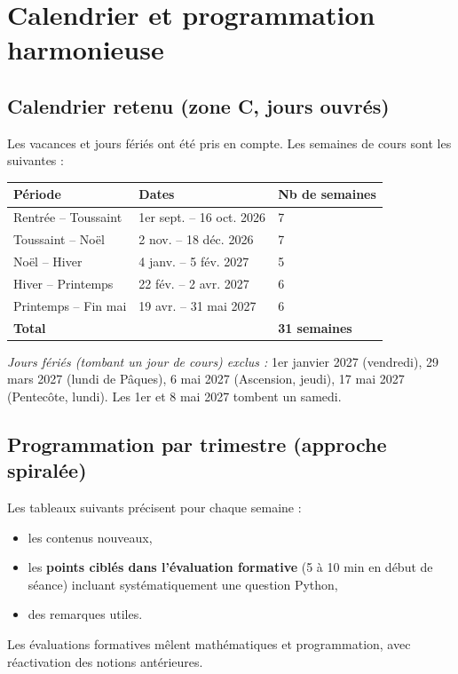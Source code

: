 \documentclass[a4paper,12pt]{article}
\begin{document}
	\section{Calendrier et programmation harmonieuse}
	
	\subsection{Calendrier retenu (zone C, jours ouvrés)}
	Les vacances et jours fériés ont été pris en compte. Les semaines de cours sont les suivantes :
	
	\begin{center}
		\begin{tabular}{|C{3.5cm}|C{5cm}|C{2.5cm}|}
			\hline
			\textbf{Période} & \textbf{Dates} & \textbf{Nb de semaines} \\
			\hline
			Rentrée – Toussaint & 1er sept. – 16 oct. 2026 & 7 \\
			Toussaint – Noël & 2 nov. – 18 déc. 2026 & 7 \\
			Noël – Hiver & 4 janv. – 5 fév. 2027 & 5 \\
			Hiver – Printemps & 22 fév. – 2 avr. 2027 & 6 \\
			Printemps – Fin mai & 19 avr. – 31 mai 2027 & 6 \\
			\hline
			\textbf{Total} & & \textbf{31 semaines} \\
			\hline
		\end{tabular}
	\end{center}
	
	\textit{Jours fériés (tombant un jour de cours) exclus :} 1er janvier 2027 (vendredi), 29 mars 2027 (lundi de Pâques), 6 mai 2027 (Ascension, jeudi), 17 mai 2027 (Pentecôte, lundi). Les 1er et 8 mai 2027 tombent un samedi.
	
	\subsection{Programmation par trimestre (approche spiralée)}
	Les tableaux suivants précisent pour chaque semaine :
	\begin{itemize}
		\item les contenus nouveaux,
		\item les \textbf{points ciblés dans l’évaluation formative} (5 à 10 min en début de séance) incluant systématiquement une question Python,
		\item des remarques utiles.
	\end{itemize}
	Les évaluations formatives mêlent mathématiques et programmation, avec réactivation des notions antérieures.
	
\end{document}

